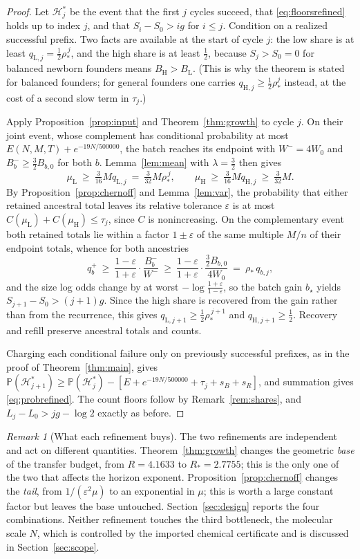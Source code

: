 \documentclass[11pt,a4paper]{article}
\theoremstyle{plain}
\theoremstyle{definition}
\theoremstyle{remark}
\newtheorem{remark}[theorem]{Remark}
\newcommand{\Prob}{\mathbb P}
\newcommand{\eps}{\varepsilon}
\newcommand{\lo}{\mathrm L}
\newcommand{\hi}{\mathrm H}
\begin{document}
\begin{proof}
Let $\mathcal H^*_j$ be the event that the first $j$ cycles succeed, that
\eqref{eq:floorsrefined} holds up to index $j$, and that $S_i-S_0>ig$ for
$i\le j$. Condition on a realized successful prefix. Two facts are available at
the start of cycle $j$: the low share is at least $q_{\lo,j}=\frac12\rho_*^{\,j}$,
and the high share is at least $\frac12$, because $S_j>S_0=0$ for balanced
newborn founders means $B_\hi>B_\lo$. (This is why the theorem is stated for
balanced founders; for general founders one carries $q_{\hi,j}\ge\frac12\rho_*^j$
instead, at the cost of a second slow term in $\tau_j$.)

Apply Proposition~\ref{prop:input} and Theorem~\ref{thm:growth} to cycle $j$.
On their joint event, whose complement has conditional probability at most
$E(N,M,T)+e^{-19N/500000}$, the batch reaches its endpoint with
$W^-=4W_0$ and $B_b^-\ge\frac32B_{b,0}$ for both $b$. Lemma~\ref{lem:mean} with
$\lambda=\frac32$ then gives
\[
\mu_\lo\ \ge\ \tfrac3{16}Mq_{\lo,j}\ =\ \tfrac3{32}M\rho_*^{\,j},\qquad
\mu_\hi\ \ge\ \tfrac3{16}Mq_{\hi,j}\ \ge\ \tfrac3{32}M .
\]
By Proposition~\ref{prop:chernoff} and Lemma~\ref{lem:var}, the probability
that either retained ancestral total leaves its relative tolerance $\eps$ is at
most $C(\mu_\lo)+C(\mu_\hi)\le\tau_j$, since $C$ is nonincreasing. On the
complementary event both retained totals lie within a factor $1\pm\eps$ of the
same multiple $M/n$ of their endpoint totals, whence for both ancestries
\[
q_b^+\ \ge\ \frac{1-\eps}{1+\eps}\cdot\frac{B_b^-}{W^-}
\ \ge\ \frac{1-\eps}{1+\eps}\cdot\frac{\frac32B_{b,0}}{4W_0}
\ =\ \rho_*\,q_{b,j},
\]
and the size log odds change by at worst $-\log\frac{1+\eps}{1-\eps}$, so the
batch gain $b_\star$ yields $S_{j+1}-S_0>(j+1)g$. Since the high share is
recovered from the gain rather than from the recurrence, this gives
$q_{\lo,j+1}\ge\frac12\rho_*^{\,j+1}$ and $q_{\hi,j+1}\ge\frac12$. Recovery and
refill preserve ancestral totals and counts.

Charging each conditional failure only on previously successful prefixes, as in
the proof of Theorem~\ref{thm:main}, gives
$\Prob(\mathcal H^*_{j+1})\ge\Prob(\mathcal H^*_j)-[E+e^{-19N/500000}+\tau_j+s_B+s_R]$,
and summation gives \eqref{eq:probrefined}. The count floors follow by
Remark~\ref{rem:shares}, and $L_j-L_0>jg-\log2$ exactly as before.
\end{proof}

\begin{remark}[What each refinement buys]\label{rem:separate}
The two refinements are independent and act on different quantities.
Theorem~\ref{thm:growth} changes the geometric \emph{base} of the transfer
budget, from $R=4.1633$ to $R_*=2.7755$; this is the only one of the two that
affects the horizon exponent. Proposition~\ref{prop:chernoff} changes the
\emph{tail}, from $1/(\eps^2\mu)$ to an exponential in $\mu$; this is worth a
large constant factor but leaves the base untouched. Section~\ref{sec:design}
reports the four combinations. Neither refinement touches the third
bottleneck, the molecular scale $N$, which is controlled by the imported
chemical certificate and is discussed in Section~\ref{sec:scope}.
\end{remark}
\end{document}

